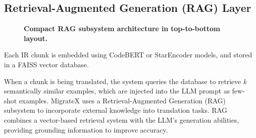 \documentclass[twocolumn]{article}
\begin{document}
\subsection{Retrieval-Augmented Generation (RAG) Layer}
\begin{figure}[htbp]
    \centering
    \caption{\textbf{Compact RAG subsystem architecture in top-to-bottom layout.}}
    \label{fig:rag_compact}
    \end{figure}
    
    

Each IR chunk is embedded using CodeBERT or StarEncoder models, and stored in a FAISS vector database.

When a chunk is being translated, the system queries the database to retrieve \emph{k} semantically similar examples, which are injected into the LLM prompt as few-shot examples.
MigrateX uses a Retrieval-Augmented Generation (RAG) subsystem to incorporate external knowledge into translation tasks. RAG combines a vector-based retrieval system with the LLM’s generation abilities, providing grounding information to improve accuracy.
\end{document}
